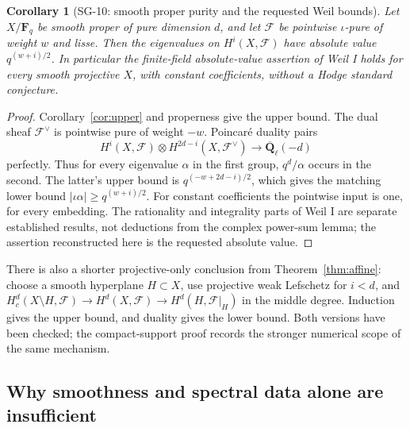 \documentclass[11pt,a4paper]{article}
\newtheorem{corollary}[theorem]{Corollary}
\theoremstyle{remark}
\begin{document}
\begin{corollary}[SG-10: smooth proper purity and the requested Weil bounds]
\label{cor:purity}
Let $X/\mathbf F_q$ be smooth proper of pure dimension $d$, and let
$\mathcal F$ be pointwise $\iota$-pure of weight $w$ and lisse.
Then the eigenvalues on $H^i(X,\mathcal F)$ have absolute value
$q^{(w+i)/2}$.  In particular the finite-field absolute-value assertion
of Weil I holds for every smooth projective $X$, with constant
coefficients, without a Hodge standard conjecture.
\end{corollary}
\begin{proof}
Corollary~\ref{cor:upper} and properness give the upper bound.
The dual sheaf $\mathcal F^\vee$ is pointwise pure of weight $-w$.
Poincar\'e duality pairs
\[
 H^i(X,\mathcal F)\otimes
 H^{2d-i}(X,\mathcal F^\vee)\longrightarrow
                         \overline{\mathbf Q}_\ell(-d)
\]
perfectly.  Thus for every eigenvalue $\alpha$ in the first group,
$q^d/\alpha$ occurs in the second.  The latter's upper bound is
$q^{(-w+2d-i)/2}$, which gives the matching lower bound
$|\iota\alpha|\ge q^{(w+i)/2}$.
For constant coefficients the pointwise input is one, for every
embedding.  The rationality and integrality parts of Weil I are
separate established results, not deductions from the complex power-sum
lemma; the assertion reconstructed here is the requested absolute value.
\end{proof}

There is also a shorter projective-only conclusion from
Theorem~\ref{thm:affine}: choose a smooth hyperplane $H\subset X$,
use projective weak Lefschetz for $i<d$, and
$H_c^d(X\setminus H,\mathcal F)\to H^d(X,\mathcal F)\to
H^d(H,\mathcal F|_H)$ in the middle degree.  Induction gives the upper
bound, and duality gives the lower bound.  Both versions have been
checked; the compact-support proof records the stronger numerical scope
of the same mechanism.

\subsection{Why smoothness and spectral data alone are insufficient}
\end{document}
